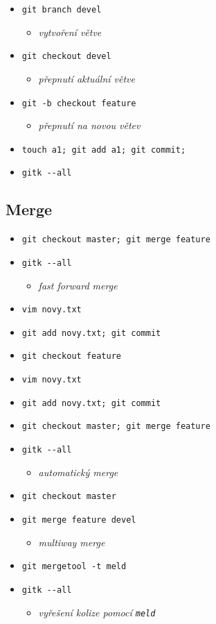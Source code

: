 \documentclass[10pt,twocolumn]{article}
\begin{document}
\begin{itemize}
  \item \texttt{git branch devel}
  \begin{itemize} \item \textit{vytvoření větve} \end{itemize}
  \item \texttt{git checkout devel}
  \begin{itemize} \item \textit{přepnutí aktuální větve} \end{itemize}
  \item \texttt{git -b checkout feature}
  \begin{itemize} \item \textit{přepnutí na novou větev} \end{itemize}
  \item \texttt{touch a1; git add a1; git commit;}
  \item \texttt{gitk {-}{-}all}
\end{itemize}

\subsection{Merge}

\begin{itemize}
  \item \texttt{git checkout master; git merge feature}
  \item \texttt{gitk {-}{-}all}
  \begin{itemize} \item \textit{fast forward merge} \end{itemize}
  \item \texttt{vim novy.txt}
  \item \texttt{git add novy.txt; git commit}
  \item \texttt{git checkout feature}
  \item \texttt{vim novy.txt}
  \item \texttt{git add novy.txt; git commit}
  \item \texttt{git checkout master; git merge feature}
  \item \texttt{gitk {-}{-}all}
  \begin{itemize} \item \textit{automatický merge} \end{itemize}
  \item \texttt{git checkout master}
  \item \texttt{git merge feature devel}
  \begin{itemize} \item \textit{multiway merge} \end{itemize}
  \item \texttt{git mergetool -t meld}
  \item \texttt{gitk {-}{-}all}
  \begin{itemize} \item \textit{vyřešení kolize pomocí \texttt{meld}} \end{itemize}
\end{itemize}
\end{document}

